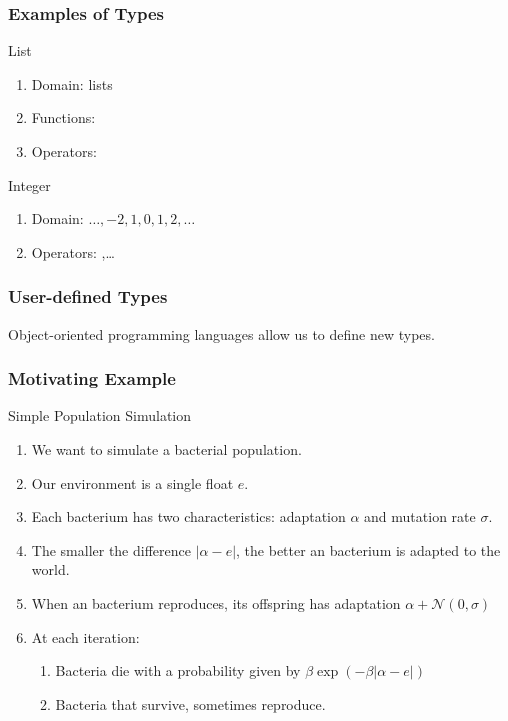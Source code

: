 \begin{frame}[fragile] 
\frametitle{Examples of Types}

\begin{block}{List}
\begin{enumerate}
\item Domain: lists
\item Functions: 
\item Operators: 
\end{enumerate}
\end{block}

\pause
\begin{block}{Integer}
\begin{enumerate}
\item Domain: $\dots,-2, 1, 0, 1, 2, \dots$
\item Operators: ,\ldots
\end{enumerate}
\end{block}
\end{frame}

\begin{frame}[fragile] 
\frametitle{User-defined Types}

Object-oriented programming languages allow us to define new types.

\end{frame}

\begin{frame}[fragile] 
\frametitle{Motivating Example}
\begin{block}{Simple Population Simulation}
\begin{enumerate}
\item We want to simulate a bacterial population.
\item Our environment is a single float $e$.
\item Each bacterium has two characteristics: adaptation $\alpha$ and mutation rate $\sigma$.
\item The smaller the difference $|\alpha-e|$, the better an bacterium is adapted to the world.
\item When an bacterium reproduces, its offspring has adaptation $\alpha + \mathcal{N}(0,\sigma)$
\item At each iteration:
\begin{enumerate}
\item Bacteria die with a probability given by $\beta\exp(-\beta|\alpha-e|)$
\item Bacteria that survive, sometimes reproduce.
\end{enumerate}
\end{enumerate}
\end{block}

\end{frame}


